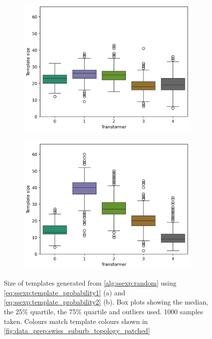 \begin{figure}[H]
    \begin{subfigure}{.5\textwidth}
      \centering
      \includegraphics[width=\linewidth]{img/switchstate_exploring/swiss_suburb/random_switchstate_distribution_tempalte_p.png}
      \caption{}
      \label{fig:ssexp:switchstate_sampels_trafo_p}
    \end{subfigure}%
    \begin{subfigure}{.5\textwidth}
      \centering
      \includegraphics[width=\linewidth]{img/switchstate_exploring/swiss_suburb/random_switchstate_distribution_choice_p.png}
      \caption{}
      \label{fig:ssexp:switchstate_sampels_choice_p}
    \end{subfigure}
    \caption{
        Size of templates generated from \autoref{alg:ssexp:random}
        using \autoref{eq:ssexp:template_probability1} (a) 
        and \autoref{eq:ssexp:template_probability2} (b).
        Box plots showing the median, the 25\% quartile, the 75\% quartile and outliers used.
        1000 samples taken. Colours match template colours shown in
        \autoref{fig:data_prep:swiss_suburb_topology_patched}
    }
    \label{fig:ssexp:switchstate_sampels}
\end{figure}


